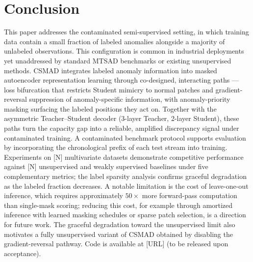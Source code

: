 
\section{Conclusion}
\label{sec:conclusion}

This paper addresses the contaminated semi-supervised setting, in which training data contain a
small fraction of labeled anomalies alongside a majority of unlabeled observations.
This configuration is common in industrial deployments yet unaddressed by standard MTSAD
benchmarks or existing unsupervised methods.
CSMAD integrates labeled anomaly information into masked autoencoder representation learning
through co-designed, interacting paths --- loss bifurcation that restricts Student mimicry to
normal patches and gradient-reversal suppression of anomaly-specific information, with
anomaly-priority masking surfacing the labeled positions they act on. Together with the asymmetric
Teacher--Student decoder (3-layer Teacher, 2-layer Student), these paths turn the capacity gap into
a reliable, amplified discrepancy signal under contaminated training.
A contaminated benchmark protocol supports evaluation by incorporating the chronological prefix
of each test stream into training.
Experiments on [N] multivariate datasets demonstrate competitive performance against [N]
unsupervised and weakly supervised baselines under five complementary metrics; the label
sparsity analysis confirms graceful degradation as the labeled fraction decreases.
A notable limitation is the cost of leave-one-out inference, which requires approximately
$50{\times}$ more forward-pass computation than single-mask scoring; reducing this cost, for
example through amortized inference with learned masking schedules or sparse patch selection,
is a direction for future work.
The graceful degradation toward the unsupervised limit also motivates a fully unsupervised
variant of CSMAD obtained by disabling the gradient-reversal pathway.
Code is available at [URL] (to be released upon acceptance).
